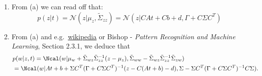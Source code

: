 \begin{enumerate}[label=3.\arabic*]
\begin{gradedsolution}
\begin{enumerate}
\begin{align*}
                \mat{\mu_z \\ \mu_w} = \tilde{\Sigma} b  = \mat{\Gamma + C \Sigma C^T & C\Sigma \\ \Sigma C^T & \Sigma}\mat{\Gamma^{-1}d \\ \Sigma^{-1}\mu - C^T\Gamma^{-1}d} = \mat{C\mu+d \\ \mu} = \mat{C(At+b)+d \\ At+b}
            \end{align*}
            and the covariance matrix:
            \begin{align*}
                \tilde{\Sigma} := \mat{\tilde{\Sigma}_{zz} & \tilde{\Sigma}_{zw} \\ \tilde{\Sigma}_{wz} & \tilde{\Sigma}_{ww}} := \mat{\Gamma + C \Sigma C^T & C\Sigma \\ \Sigma C^T & \Sigma}.
            \end{align*}
            \item {} From (a) we can read off that:
            \[p(z|t) = \mathcal{N}(z|\mu_z, \tilde{\Sigma}_{zz}) = \mathcal{N}(z|C At + Cb + d, \Gamma + C \Sigma C^T)\]
            \item {} From (a) and e.g.\ \href{https://en.wikipedia.org/wiki/Multivariate_normal_distribution}{wikipedia} or Bishop - \emph{Pattern Recognition and Machine Learning}, Section 2.3.1, we deduce that
            \begin{align*}
                 & p(w|z, t) = \Ncal(w|\mu_w + \tilde{\Sigma}_{wz}\tilde{\Sigma}_{zz}^{-1}(z - \mu_z), \tilde{\Sigma}_{ww} - \tilde{\Sigma}_{wz}\tilde{\Sigma}_{zz}^{-1}\tilde{\Sigma}_{zw}) \\
                 & = \Ncal(w|At+b + \Sigma C^T(\Gamma + C\Sigma C^T)^{-1}(z-C(At+b) - d), \Sigma - \Sigma C^T(\Gamma + C\Sigma C^T)^{-1}C\Sigma).
            \end{align*}
        \end{enumerate}
    \end{gradedsolution}


\end{enumerate}
